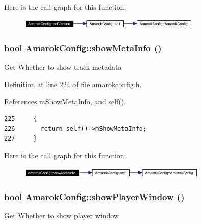 Here is the call graph for this function:\begin{figure}[H]
\begin{center}
\leavevmode
\includegraphics[width=247pt]{classAmarokConfig_AmarokConfige1_cgraph}
\end{center}
\end{figure}
\subsubsection{\setlength{\rightskip}{0pt plus 5cm}bool Amarok\-Config::show\-Meta\-Info ()\hspace{0.3cm}{\tt  [inline, static]}}\label{classAmarokConfig_AmarokConfige22}


Get Whether to show track metadata 

Definition at line 224 of file amarokconfig.h.

References m\-Show\-Meta\-Info, and self().



\footnotesize\begin{verbatim}225     {
226       return self()->mShowMetaInfo;
227     }
\end{verbatim}\normalsize 


Here is the call graph for this function:\begin{figure}[H]
\begin{center}
\leavevmode
\includegraphics[width=255pt]{classAmarokConfig_AmarokConfige22_cgraph}
\end{center}
\end{figure}
\subsubsection{\setlength{\rightskip}{0pt plus 5cm}bool Amarok\-Config::show\-Player\-Window ()\hspace{0.3cm}{\tt  [inline, static]}}\label{classAmarokConfig_AmarokConfige26}


Get Whether to show player window 

